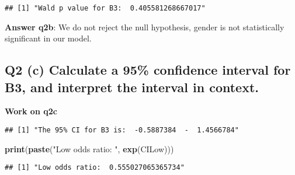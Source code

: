 \documentclass[
]{article}
\newenvironment{Shaded}{\begin{snugshade}}{\end{snugshade}}
\newcommand{\CommentTok}[1]{\textcolor[rgb]{0.56,0.35,0.01}{\textit{#1}}}
\newcommand{\FloatTok}[1]{\textcolor[rgb]{0.00,0.00,0.81}{#1}}
\newcommand{\KeywordTok}[1]{\textcolor[rgb]{0.13,0.29,0.53}{\textbf{#1}}}
\newcommand{\NormalTok}[1]{#1}
\newcommand{\OperatorTok}[1]{\textcolor[rgb]{0.81,0.36,0.00}{\textbf{#1}}}
\newcommand{\StringTok}[1]{\textcolor[rgb]{0.31,0.60,0.02}{#1}}
\begin{document}
\begin{verbatim}
## [1] "Wald p value for B3:  0.405581268667017"
\end{verbatim}

\textbf{Answer q2b}: We do not reject the null hypothesis, gender is not
statistically significant in our model.

\hypertarget{q2-c-calculate-a-95-confidence-interval-for-b3-and-interpret-the-interval-in-context.}{%
\subsection{Q2 (c) Calculate a 95\% confidence interval for B3, and
interpret the interval in
context.}\label{q2-c-calculate-a-95-confidence-interval-for-b3-and-interpret-the-interval-in-context.}}

\textbf{Work on q2c}

\begin{Shaded}
\end{Shaded}

\begin{verbatim}
## [1] "The 95% CI for B3 is:  -0.5887384  -  1.4566784"
\end{verbatim}

\begin{Shaded}
\begin{Highlighting}[]
\KeywordTok{print}\NormalTok{(}\KeywordTok{paste}\NormalTok{(}\StringTok{"Low odds ratio: "}\NormalTok{, }\KeywordTok{exp}\NormalTok{(CILow)))}
\end{Highlighting}
\end{Shaded}

\begin{verbatim}
## [1] "Low odds ratio:  0.555027065365734"
\end{verbatim}
\end{document}
